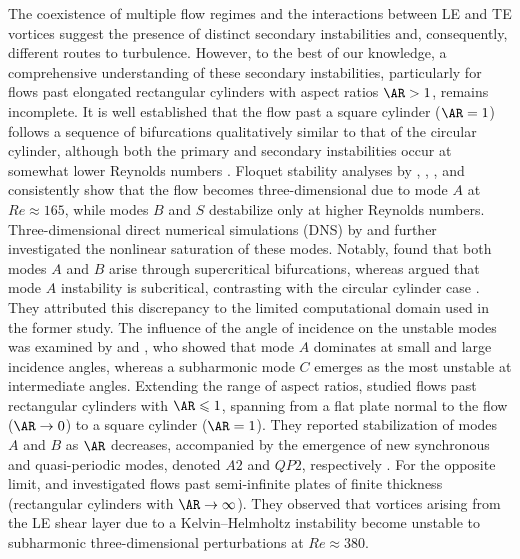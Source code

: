The coexistence of multiple flow regimes and the interactions between LE and TE vortices suggest the presence of distinct secondary instabilities and, consequently, different routes to turbulence. However, to the best of our knowledge, a comprehensive understanding of these secondary instabilities, particularly for flows past elongated rectangular cylinders with aspect ratios $\AR > 1$, remains incomplete.
%
It is well established that the flow past a square cylinder ($\AR=1$) follows a sequence of bifurcations qualitatively similar to that of the circular cylinder, although both the primary and secondary instabilities occur at somewhat lower Reynolds numbers \citep[e.g.][]{jiang-cheng-2018,blackburn-sheard-2010}. Floquet stability analyses by \citet{robichaux-balachandar-vanka-1999}, \citet{blackburn-lopez-2003}, \citet{sheard-fitzgerald-ryan-2009}, and \citet{blackburn-sheard-2010} consistently show that the flow becomes three-dimensional due to mode $A$ at $Re \approx 165$, while modes $B$ and $S$ destabilize only at higher Reynolds numbers. Three-dimensional direct numerical simulations (DNS) by \citet{sheard-fitzgerald-ryan-2009} and \citet{jiang-cheng-an-2018} further investigated the nonlinear saturation of these modes. Notably, \citet{sheard-fitzgerald-ryan-2009} found that both modes $A$ and $B$ arise through supercritical bifurcations, whereas \citet{jiang-cheng-an-2018} argued that mode $A$ instability is subcritical, contrasting with the circular cylinder case \citep{henderson-1997}. They attributed this discrepancy to the limited computational domain used in the former study.
%
The influence of the angle of incidence on the unstable modes was examined by \citet{sheard-fitzgerald-ryan-2009} and \citet{sheard-2011}, who showed that mode $A$ dominates at small and large incidence angles, whereas a subharmonic mode $C$ emerges as the most unstable at intermediate angles. Extending the range of aspect ratios, \citet{choi-yang-2014} studied flows past rectangular cylinders with $\AR \leq 1$, spanning from a flat plate normal to the flow ($\AR \to 0$) to a square cylinder ($\AR=1$). They reported stabilization of modes $A$ and $B$ as $\AR$ decreases, accompanied by the emergence of new synchronous and quasi-periodic modes, denoted $A2$ and $QP2$, respectively \citep[see also][]{thompson-etal-2006}.
%
For the opposite limit, \citet{chaurasia-thompson-2011} and \citet{huang-etal-2017} investigated flows past semi-infinite plates of finite thickness (rectangular cylinders with $\AR \to \infty$). They observed that vortices arising from the LE shear layer due to a Kelvin–Helmholtz instability become unstable to subharmonic three-dimensional perturbations at $Re \approx 380$.
